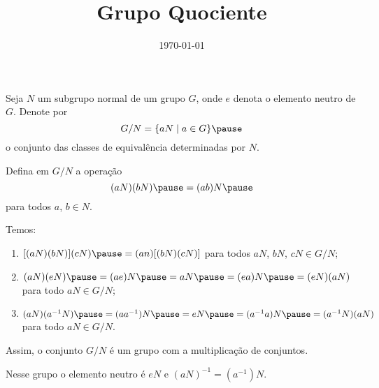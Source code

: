 \documentclass{beamer}
\title{Grupo Quociente}
\author[\autor]{\autor}
\institute[\instituto]{\instituto}
\date{\today}
\begin{document}
    \begin{frame}
        \maketitle
    \end{frame}


    \begin{frame}
        Seja $N$ um subgrupo normal \pause de um grupo $G$, onde $e$ denota o elemento neutro de $G$. \pause Denote por \pause
        \[
            G/N = \{aN \mid a \in G\} \pause
        \]
        o conjunto das classes de equivalência determinadas por $N$. \pause
        
        \vspace{.5cm}

        Defina em $G/N$ a operação \pause
        \[
            (aN)(bN)  \pause = (ab)N \pause
        \]
        para todos $a$, $b \in N$. \pause
    \end{frame}

    \begin{frame}
        Temos: \pause

        \vspace{.3cm}
        
        \begin{enumerate}[label={\roman*})]
            \item $[(aN)(bN)](cN) \pause = (an)[(bN)(cN)]$ \pause para todos $aN$, $bN$, $cN \in G/N$; \pause

            \vspace{.3cm}
        
            \item $(aN)(eN) \pause = (ae)N \pause = aN \pause = (ea)N \pause = (eN)(aN)$ \pause para todo $aN \in G/N$; \pause

            \vspace{.3cm}
        
            \item $(aN)(a^{-1}N) \pause = (aa^{-1})N \pause = eN \pause = (a^{-1}a)N \pause = (a^{-1}N)(aN)$ \pause para todo $aN \in G/N$. \pause

            \vspace{.3cm}
        \end{enumerate}

        Assim, o conjunto $G/N$ é um grupo com a multiplicação de conjuntos. \pause

        \vspace{.3cm}
        
        Nesse grupo o elemento neutro é $eN$ \pause e $(aN)^{-1} = (a^{-1})N$.
    \end{frame}
\end{document}
